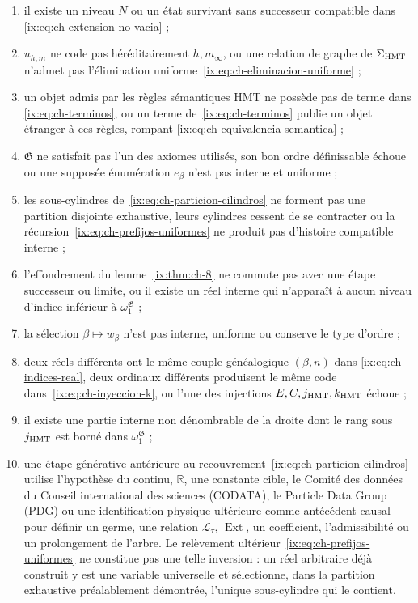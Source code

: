 \begin{enumerate}
\item il existe un niveau \(N\) ou un état survivant sans successeur compatible dans \eqref{ix:eq:ch-extension-no-vacia} ;
\item \(u_{h,m}\) ne code pas héréditairement \(h,m_\infty\), ou une relation
de graphe de \(\Sigma_{\rm HMT}\) n’admet pas l’élimination uniforme~\eqref{ix:eq:ch-eliminacion-uniforme} ;
\item un objet admis par les règles sémantiques HMT ne possède pas de terme dans \eqref{ix:eq:ch-terminos}, ou un terme de~\eqref{ix:eq:ch-terminos} publie un objet étranger à ces règles, rompant \eqref{ix:eq:ch-equivalencia-semantica} ;
\item \(\mathfrak G\) ne satisfait pas l’un des axiomes utilisés, son bon
ordre définissable échoue ou une supposée énumération \(e_\beta\) n’est pas interne et
uniforme ;
\item les sous-cylindres de~\eqref{ix:eq:ch-particion-cilindros} ne forment pas une partition disjointe exhaustive, leurs cylindres cessent de se contracter ou la récursion~\eqref{ix:eq:ch-prefijos-uniformes} ne produit pas d'histoire compatible interne ;
\item l’effondrement du lemme~\ref{ix:thm:ch-8} ne commute pas avec une étape successeur ou limite, ou il existe
un réel interne qui n’apparaît à aucun niveau d’indice inférieur à
\(\omega_1^{\mathfrak G}\) ;
\item la sélection \(\beta\mapsto w_\beta\) n’est pas interne, uniforme ou conserve
le type d’ordre ;
\item deux réels différents ont le même couple généalogique \((\beta,n)\) dans
\eqref{ix:eq:ch-indices-real}, deux ordinaux différents produisent le même code dans~\eqref{ix:eq:ch-inyeccion-k}, ou
l’une des injections \(E,C,j_{\rm HMT},k_{\rm HMT}\) échoue ;
\item il existe une partie interne non dénombrable de la droite dont le rang sous \(j_{\rm HMT}\) est borné dans \(\omega_1^{\mathfrak G}\) ;
\item une étape générative antérieure au recouvrement~\eqref{ix:eq:ch-particion-cilindros} utilise l’hypothèse du continu,
\(\mathbb R\), une constante cible, le Comité des données du Conseil
international des sciences (CODATA), le Particle Data Group (PDG) ou une identification physique
ultérieure comme antécédent causal pour définir un germe, une relation
\(\mathscr L_\tau\), \(\operatorname{Ext}\), un coefficient, l’admissibilité
ou un prolongement de l’arbre. Le relèvement
ultérieur~\eqref{ix:eq:ch-prefijos-uniformes} ne constitue pas une telle inversion : un réel arbitraire déjà construit y est une variable
universelle et sélectionne, dans la partition exhaustive préalablement
démontrée, l’unique sous-cylindre qui le contient.
\end{enumerate}

